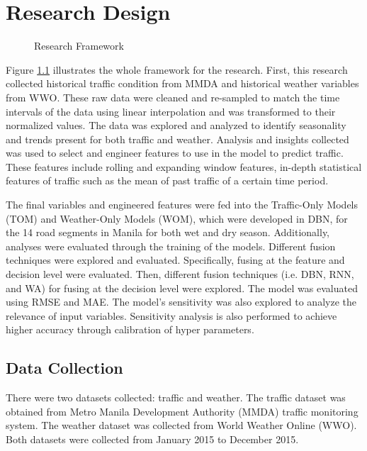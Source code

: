 \chapter{Research Design}
\label{resdes}
\begin{comment}

\end{comment}

\begin{figure}[h]
	\centering
	\captionsetup{justification=centering}
	\caption{Research Framework}
	\label{fig:framework}
\end{figure}




Figure \ref{fig:framework} illustrates the whole framework for the research. First, this research collected historical traffic condition from MMDA and historical weather variables from WWO. These raw data were cleaned and re-sampled to match the time intervals of the data using linear interpolation and was transformed to their normalized values. The data was explored and analyzed to identify seasonality and trends present for both traffic and weather. Analysis and insights collected was used to select and engineer features to use in the model to predict traffic. These features include rolling and expanding window features, in-depth statistical features of traffic such as the mean of past traffic of a certain time period. 

The final variables and engineered features were fed into the Traffic-Only Models (TOM) and Weather-Only Models (WOM), which were developed in DBN, for the 14 road segments in Manila for both wet and dry season. Additionally, analyses were evaluated through the training of the models. Different fusion techniques were explored and evaluated. Specifically, fusing at the feature and decision level were evaluated. Then, different fusion techniques (i.e. DBN, RNN, and WA) for fusing at the decision level were explored. The model was evaluated using RMSE and MAE. The model’s sensitivity was also explored to analyze the relevance of input variables. Sensitivity analysis is also performed to achieve higher accuracy through calibration of hyper parameters. 

\section{Data Collection}
 \label{rd_datacollection}
There were two datasets collected: traffic and weather. The traffic dataset was obtained from Metro Manila Development Authority (MMDA) traffic monitoring system. The weather dataset was collected from World Weather Online (WWO). Both datasets were collected from January 2015 to December 2015.

